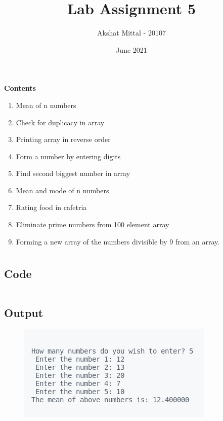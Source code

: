 \documentclass[12pt]{article}
\title{Lab Assignment 5}
\author{Akshat Mittal - 20107}
\date{June 2021}
\begin{document}
\maketitle
\vspace{7mm}
\textbf{Contents}
\vspace{7mm}
\begin{enumerate}
    \item Mean of n numbers
    \item Check for duplicacy in array
    \item Printing array in reverse order
    \item Form a number by entering digits
    \item Find second biggest number in array
    \item Mean and mode of n numbers
    \item Rating food in cafetria
    \item Eliminate prime numbers from 100 element array
    \item Forming a new array of the numbers divisible by 9 from an array.
\end{enumerate}

\newpage
\section{}
\subsection{Code}
\inputminted{c}{q1.c}
\subsection{Output}
\begin{figure}[h]
    \centering
    \includegraphics{1.png}
\end{figure}

\newpage
\section{}
\end{document}
